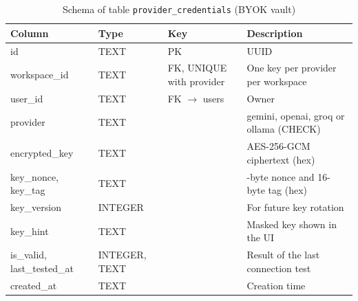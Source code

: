 \begin{table}[htbp]
\centering\small
\caption{Schema of table \texttt{provider\_credentials} (BYOK vault)}\label{tab:schema_provider_credentials}
\begin{tabularx}{\textwidth}{@{}>{\raggedright\arraybackslash}p{} >{\raggedright\arraybackslash}p{} >{\raggedright\arraybackslash}p{} >{\raggedright\arraybackslash}X@{}}
\toprule
\textbf{Column} & \textbf{Type} & \textbf{Key} & \textbf{Description}\\
\midrule
id & TEXT & PK & UUID\\
workspace\_id & TEXT & FK, UNIQUE with provider & One key per provider per workspace\\
user\_id & TEXT & FK $\rightarrow$ users & Owner\\
provider & TEXT & & gemini, openai, groq or ollama (CHECK)\\
encrypted\_key & TEXT & & AES-256-GCM ciphertext (hex)\\
key\_nonce, key\_tag & TEXT & & 12-byte nonce and 16-byte tag (hex)\\
key\_version & INTEGER & & For future key rotation\\
key\_hint & TEXT & & Masked key shown in the UI\\
is\_valid, last\_tested\_at & INTEGER, TEXT & & Result of the last connection test\\
created\_at & TEXT & & Creation time\\
\bottomrule
\end{tabularx}
\end{table}

